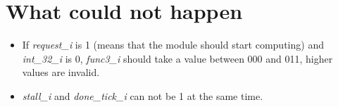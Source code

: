 \section{What could not happen}

\begin{itemize}
    \item If \textit{request\_i} is 1 (means that the module should start computing) and \textit{int\_32\_i} is 0, \textit{func3\_i} should take a value between 000 and 011, higher values are invalid.
    \item \textit{stall\_i} and \textit{done\_tick\_i} can not be 1 at the same time.
\end{itemize}
